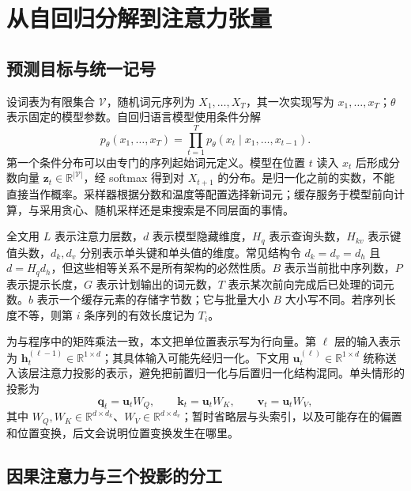 \documentclass[UTF8,12pt,a4paper,fontset=fandol]{ctexart}
\begin{document}
\section{从自回归分解到注意力张量}
\label{sec:kv-attention}

\subsection{预测目标与统一记号}

设词表为有限集合 $\mathcal V$，随机词元序列为 $X_1,\ldots,X_T$，其一次实现写为 $x_1,\ldots,x_T$；$\theta$ 表示固定的模型参数。自回归语言模型使用条件分解
\begin{equation}
 p_\theta(x_1,\ldots,x_T)
 =\prod_{t=1}^{T}p_\theta(x_t\mid x_1,\ldots,x_{t-1}).
 \label{eq:kv-autoregressive}
\end{equation}
第一个条件分布可以由专门的序列起始词元定义。模型在位置 $t$ 读入 $x_t$ 后形成分数向量 $\mathbf z_t\in\mathbb R^{|\mathcal V|}$，经 softmax 得到对 $X_{t+1}$ 的分布。是归一化之前的实数，不能直接当作概率。采样器根据分数和温度等配置选择新词元；缓存服务于模型前向计算，与采用贪心、随机采样还是束搜索是不同层面的事情。

全文用 $L$ 表示注意力层数，$d$ 表示模型隐藏维度，$H_q$ 表示查询头数，$H_{kv}$ 表示键值头数，$d_k,d_v$ 分别表示单头键和单头值的维度。常见结构令 $d_k=d_v=d_h$ 且 $d=H_qd_h$，但这些相等关系不是所有架构的必然性质。$B$ 表示当前批中序列数，$P$ 表示提示长度，$G$ 表示计划输出的词元数，$T$ 表示某次前向完成后已处理的词元数。$b$ 表示一个缓存元素的存储字节数；它与批量大小 $B$ 大小写不同。若序列长度不等，则第 $i$ 条序列的有效长度记为 $T_i$。

为与程序中的矩阵乘法一致，本文把单位置表示写为行向量。第 $\ell$ 层的输入表示为 $\mathbf h_t^{(\ell-1)}\in\mathbb R^{1\times d}$；其具体输入可能先经归一化。下文用 $\mathbf u_t^{(\ell)}\in\mathbb R^{1\times d}$ 统称送入该层注意力投影的表示，避免把前置归一化与后置归一化结构混同。单头情形的投影为
\begin{equation}
 \mathbf q_t=\mathbf u_tW_Q,\qquad
 \mathbf k_t=\mathbf u_tW_K,\qquad
 \mathbf v_t=\mathbf u_tW_V,
 \label{eq:kv-projection}
\end{equation}
其中 $W_Q,W_K\in\mathbb R^{d\times d_k}$、$W_V\in\mathbb R^{d\times d_v}$；暂时省略层与头索引，以及可能存在的偏置和位置变换，后文会说明位置变换发生在哪里。

\subsection{因果注意力与三个投影的分工}
\end{document}
